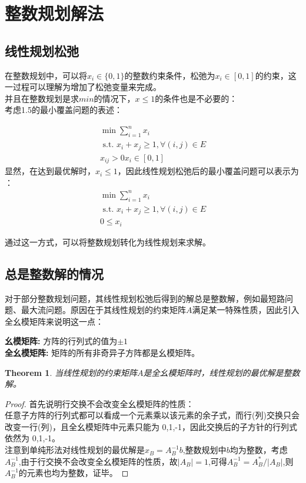 \documentclass[11pt]{ctexart}
\newtheorem{theorem}{Theorem}
\newtheorem{proof}{Proof}[section]
\begin{document}
\section{整数规划解法}

\subsection{线性规划松弛}

在整数规划中，可以将$x_i \in \{0,1\}$的整数约束条件，松弛为$x_i \in [0,1]$的约束，这一过程可以理解为增加了松弛变量来完成。\\

并且在整数规划是求$min$的情况下，$x  \leq 1$的条件也是不必要的：\\
考虑1.5的最小覆盖问题的表述：

$$
\begin{array}{c}
\min \sum_{i=1}^{n} x_{i} \\
\text { s.t. } x_{i}+x_{j} \geq 1, \forall(i, j) \in E \\
x_{i j}>0
x_i \in [0,1]
\end{array}
$$
显然，在达到最优解时，$x_i \leq 1$，因此线性规划松弛后的最小覆盖问题可以表示为
：
$$
\begin{array}{c}
\min \sum_{i=1}^{n} x_{i} \\
\text { s.t. } x_{i}+x_{j} \geq 1, \forall(i, j) \in E \\
0 \leq x_i
\end{array}
$$

通过这一方式，可以将整数规划转化为线性规划来求解。

\subsection{总是整数解的情况}

对于部分整数规划问题，其线性规划松弛后得到的解总是整数解，例如最短路问题、最大流问题。原因在于其线性规划的约束矩阵$A$满足某一特殊性质，因此引入全幺模矩阵来说明这一点：

\textbf{幺模矩阵:} 方阵的行列式的值为$\pm 1$ \\
\textbf{全幺模矩阵:} 矩阵的所有非奇异子方阵都是幺模矩阵。

\begin{theorem}
当线性规划的约束矩阵$A$是全幺模矩阵时，线性规划的最优解是整数解。
\end{theorem}

\begin{proof}
首先说明行交换不会改变全幺模矩阵的性质：\\
任意子方阵的行列式都可以看成一个元素乘以该元素的余子式，而行(列)交换只会改变一行(列)，且全幺模矩阵中元素只能为 0,1,-1，因此交换后的子方针的行列式依然为 0,1,-1。\\

注意到单纯形法对线性规划的最优解是$x_B=A^{-1}_{B}b$,整数规划中$b$均为整数，考虑$A^{-1}_{B}$,由于行交换不会改变全幺模矩阵的性质，故$\vert A_B\vert  = 1$,可得$A_B^{-1} = A_B^*/\vert A_B\vert$,则$A_B^{-1}$的元素也均为整数，证毕。
\end{proof}
\end{document}

